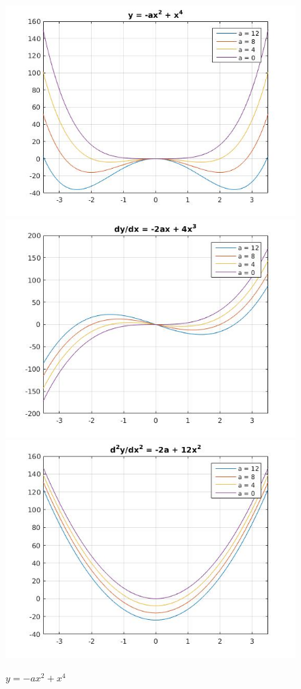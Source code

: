 \documentclass{article}
\begin{document}
\begin{figure}[!h]
    \centering
    \includegraphics[scale = 0.4]{16.jpg}
    \includegraphics[scale = 0.4]{17.jpg}
    \includegraphics[scale = 0.5]{18.jpg}
    \caption{$y = −ax^{2} + x^{4}$}
    \label{fig : y = −ax^2 + x^4}
\end{figure}
\end{document}
